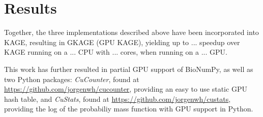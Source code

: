 \section*{Results}

Together, the three implementations described above have been incorporated into KAGE, resulting in GKAGE (GPU KAGE), yielding up to ... speedup over KAGE running on a ... CPU with ... cores, when running on a ... GPU.

This work has further resulted in partial GPU support of BioNumPy, as well as two Python packages: \textit{CuCounter}, found at \url{https://github.com/jorgenwh/cucounter}, providing an easy to use static GPU hash table, and \textit{CuStats}, found at \url{https://github.com/jorgenwh/custats}, providing the log of the probabiliy mass function with GPU support in Python.

